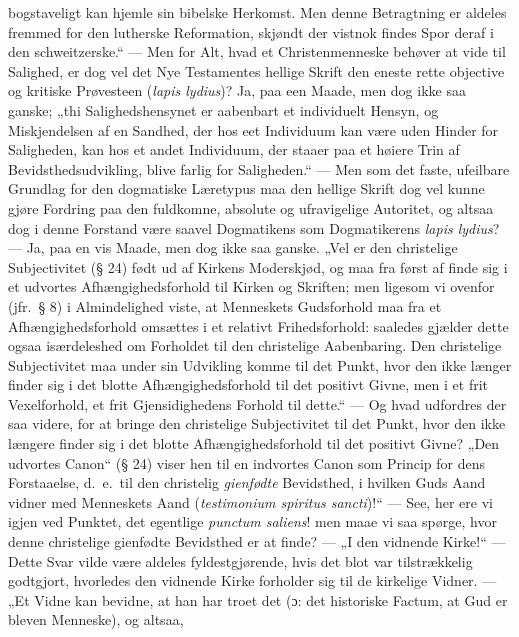 bogstaveligt kan hjemle sin bibelske Herkomst. Men denne
Betragtning er aldeles fremmed for den lutherske Reformation,
skjøndt der vistnok findes Spor deraf i den schweitzerske.“ ---
Men for Alt, hvad et Christenmenneske behøver at vide til
Salighed, er dog vel det Nye Testamentes hellige Skrift den eneste
rette objective og kritiske Prøvesteen (\textit{lapis lydius})?
Ja, paa een Maade, men dog ikke saa ganske; „thi
Salighedshensynet er aabenbart et individuelt Hensyn, og
Miskjendelsen af en Sandhed, der hos eet Individuum kan være uden
Hinder for Saligheden, kan hos et andet Individuum, der staaer paa
et høiere Trin af Bevidsthedsudvikling, blive farlig for
Saligheden.“ --- Men som
 det faste, ufeilbare Grundlag for den dogmatiske Læretypus maa den
hellige Skrift dog vel kunne gjøre Fordring paa den fuldkomne,
absolute og ufravigelige Autoritet, og altsaa dog i denne Forstand
være saavel Dogmatikens som Dogmatikerens \textit{lapis lydius}?
--- Ja, paa en vis Maade, men dog ikke saa ganske. „Vel er den
christelige Subjectivitet (§ 24) født ud af Kirkens Moderskjød, og
maa fra først af finde sig i et udvortes Afhængighedsforhold til
Kirken og Skriften; men ligesom vi ovenfor (jfr.\ § 8) i
Almindelighed viste, at Menneskets Gudsforhold maa fra et
Afhængighedsforhold omsættes i et relativt Frihedsforhold:
saaledes gjælder dette ogsaa isærdeleshed om Forholdet til den
christelige Aabenbaring. Den christelige Subjectivitet maa under
sin Udvikling komme til det Punkt, hvor den ikke længer finder sig
i det blotte Afhængighedsforhold til det positivt Givne, men i et
frit Vexelforhold, et frit Gjensidighedens Forhold til dette.“ ---
Og hvad udfordres der saa videre, for at bringe den christelige
Subjectivitet til det Punkt, hvor den ikke længere finder sig i
det blotte Afhængighedsforhold til det positivt Givne? „Den
udvortes Canon“ (§ 24) viser hen til en indvortes Canon som
Princip for dens Forstaaelse, d.\ e.\ til den christelig
\emph{gienfødte} Bevidsthed, i hvilken Guds Aand vidner med
Menneskets Aand (\textit{testimonium spiritus sancti})!“ --- See,
her ere vi igjen ved Punktet, det egentlige \textit{punctum
saliens}! men maae vi saa spørge, hvor denne christelige gienfødte
Bevidsthed
 er at finde? --- „I den vidnende Kirke!“ --- Dette Svar vilde
være aldeles fyldestgjørende, hvis det blot var tilstrækkelig
godtgjort, hvorledes den vidnende Kirke forholder sig til de
kirkelige Vidner. --- „Et Vidne kan bevidne, at han har troet det
(ɔ: det historiske Factum, at Gud er bleven Menneske), og altsaa,

